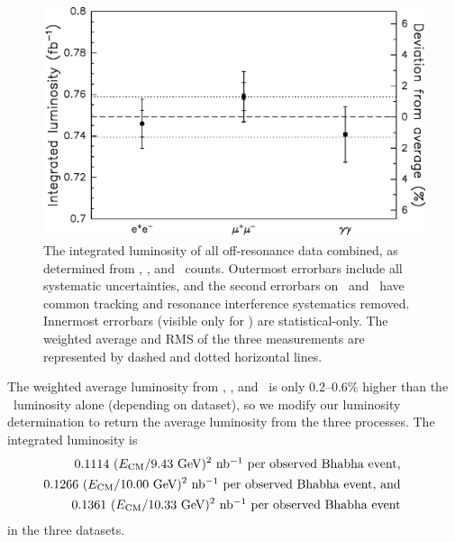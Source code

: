\documentclass{cornell}
\begin{document}
\begin{figure}[p]
  \begin{center}
    \includegraphics[width=\linewidth]{comparelumis}
  \end{center}
  \caption[Integrated luminosity in \ee, \mumu, and \gamgam\
  measurements]{\label{comparelumis} The integrated luminosity of all
  off-resonance data combined, as determined from \ee, \mumu, and
  \gamgam\ counts.  Outermost errorbars include all systematic
  uncertainties, and the second errorbars on \ee\ and \mumu\ have
  common tracking and resonance interference systematics removed.
  Innermost errorbars (visible only for \mumu) are statistical-only.
  The weighted average and RMS of the three measurements are
  represented by dashed and dotted horizontal lines.}
\end{figure}

The weighted average luminosity from \ee, \mumu, and \gamgam\ is only
0.2--0.6\% higher than the \ee\ luminosity alone (depending on
dataset), so we modify our luminosity determination to return the
average luminosity from the three processes.  The integrated
luminosity is
\begin{eqnarray}
  \mbox{\hspace{-1 cm}} && 0.1114 \mbox{ } (E_\subs{CM}/\mbox{9.43~GeV})^2 \mbox{ nb\inv\ per observed Bhabha event,} \\
  \mbox{\hspace{-1 cm}} && 0.1266 \mbox{ } (E_\subs{CM}/\mbox{10.00~GeV})^2 \mbox{ nb\inv\ per observed Bhabha event, and} \\
  \mbox{\hspace{-1 cm}} && 0.1361 \mbox{ } (E_\subs{CM}/\mbox{10.33~GeV})^2 \mbox{ nb\inv\ per observed Bhabha event}
\end{eqnarray}
in the three datasets.
\end{document}
